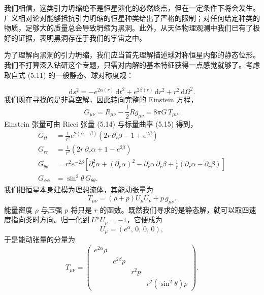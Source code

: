 我们相信，这类引力坍缩绝不是恒星演化的必然终点，但在一定条件下将会发生。广义相对论对能够抵抗引力坍缩的恒星种类给出了严格的限制；对任何给定种类的物质，足够大的质量总会导致坍缩为黑洞。此外，从天体物理观测中我们已有了极好的证据，表明黑洞存在于我们的宇宙之中。

为了理解向黑洞的引力坍缩，我们应当首先理解描述球对称恒星内部的静态位形。我们不打算深入钻研这个专题，只需对内解的基本特征获得一点感觉就够了。考虑取自式 (5.11) 的一般静态、球对称度规：


\begin{equation*}
\mathrm{d}s^2 = -e^{2\alpha(r)}\,\mathrm{d}t^2 + e^{2\beta(r)}\,\mathrm{d}r^2 + r^2\,\mathrm{d}\Omega^2.
\tag{5.133}
\end{equation*}
我们现在寻找的是非真空解，因此转向完整的 Einstein 方程，
\begin{equation*}
G_{\mu\nu} = R_{\mu\nu} - \frac{1}{2}R g_{\mu\nu} = 8\pi G\,T_{\mu\nu}.
\tag{5.134}
\end{equation*}
Einstein 张量可由 Ricci 张量 (5.14) 与标量曲率 (5.15) 得到，
\begin{align*}
G_{tt} &= \frac{1}{r^2}e^{2(\alpha-\beta)}\left(2r\,\partial_r\beta - 1 + e^{2\beta}\right)\\
G_{rr} &= \frac{1}{r^2}\left(2r\,\partial_r\alpha + 1 - e^{2\beta}\right)\\
G_{\theta\theta} &= r^2 e^{-2\beta}\left[\partial_r^2\alpha + (\partial_r\alpha)^2 - \partial_r\alpha\,\partial_r\beta + \frac{1}{r}(\partial_r\alpha - \partial_r\beta)\right]\\
G_{\phi\phi} &= \sin^2\theta\, G_{\theta\theta}.
\tag{5.135}
\end{align*}
我们把恒星本身建模为理想流体，其能动张量为
\begin{equation*}
T_{\mu\nu} = (\rho + p)U_\mu U_\nu + p\,g_{\mu\nu}.
\tag{5.136}
\end{equation*}
能量密度 $\rho$ 与压强 $p$ 将只是 $r$ 的函数。既然我们寻求的是静态解，就可以取四速度指向类时方向。归一化到 $U^\mu U_\mu = -1$，它便成为
\begin{equation*}
U_\mu = (e^{\alpha},\, 0,\, 0,\, 0),
\tag{5.137}
\end{equation*}
于是能动张量的分量为
\begin{equation*}
T_{\mu\nu} =
\begin{pmatrix}
e^{2\alpha}\rho & & & \\
& e^{2\beta}p & & \\
& & r^2 p & \\
& & & r^2(\sin^2\theta)p
\end{pmatrix}.
\tag{5.138}
\end{equation*}

